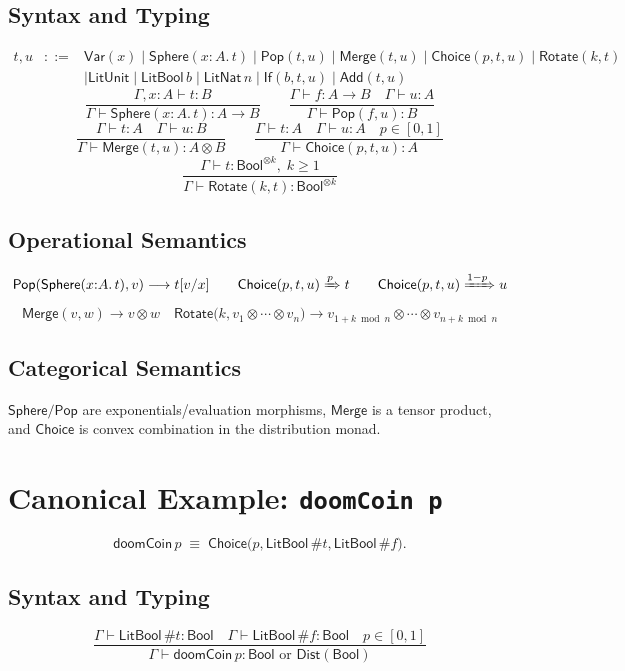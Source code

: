 \documentclass{article}
\newcommand{\Var}{\mathsf{Var}}
\newcommand{\Sphere}{\mathsf{Sphere}}
\newcommand{\Pop}{\mathsf{Pop}}
\newcommand{\Merge}{\mathsf{Merge}}
\newcommand{\Choice}{\mathsf{Choice}}
\newcommand{\Rotate}{\mathsf{Rotate}}
\newcommand{\LitUnit}{\mathsf{LitUnit}}
\newcommand{\LitBool}[1]{\mathsf{LitBool}\,#1}
\newcommand{\LitNat}[1]{\mathsf{LitNat}\,#1}
\newcommand{\If}{\mathsf{If}}
\newcommand{\Add}{\mathsf{Add}}
\newcommand{\Dist}{\mathsf{Dist}}
\newcommand{\Bool}{\mathsf{Bool}}
\newcommand{\doomCoin}[1]{\mathsf{doomCoin}\,#1}
\newcommand{\LongRightarrowp}[1]{\xRightarrow{#1}} %
\newcommand{\longto}{\longrightarrow}
\begin{document}
\subsection{Syntax and Typing}
\[
\begin{array}{rcl}
t,u &::=& \Var(x) \mid \Sphere(x{:}A.\,t) \mid \Pop(t,u) \mid \Merge(t,u) \mid \Choice(p,t,u) \mid \Rotate(k,t) \\
    && \mid \LitUnit \mid \LitBool{b} \mid \LitNat{n} \mid \If(b,t,u) \mid \Add(t,u)
\end{array}
\]
\[
\frac{\Gamma, x{:}A \vdash t : B}{\Gamma \vdash \Sphere(x{:}A.\,t) : A \to B}
\qquad
\frac{\Gamma \vdash f : A \to B \quad \Gamma \vdash u : A}{\Gamma \vdash \Pop(f,u) : B}
\]
\[
\frac{\Gamma \vdash t : A \quad \Gamma \vdash u : B}{\Gamma \vdash \Merge(t,u) : A \otimes B}
\qquad
\frac{\Gamma \vdash t : A \quad \Gamma \vdash u : A \quad p \in [0,1]}{\Gamma \vdash \Choice(p,t,u) : A}
\]
\[
\frac{\Gamma \vdash t : \Bool^{\otimes k},\; k \ge 1}{\Gamma \vdash \Rotate(k,t) : \Bool^{\otimes k}}
\]

\subsection{Operational Semantics}
\[
\Pop(\Sphere(x{:}A.\,t), v) \longto t[v/x]
\qquad
\Choice(p,t,u) \LongRightarrowp{p} t
\qquad
\Choice(p,t,u) \LongRightarrowp{1-p} u
\]
\[
\Merge(v,w) \longto v \otimes w
\quad
\Rotate\bigl(k, v_1 \otimes \cdots \otimes v_n\bigr) \longto v_{1+k \bmod n} \otimes \cdots \otimes v_{n+k \bmod n}
\]

\subsection{Categorical Semantics}
\(\Sphere/\Pop\) are exponentials/evaluation morphisms, \(\Merge\) is a tensor product, and \(\Choice\) is convex combination in the distribution monad.

\section{Canonical Example: \texttt{doomCoin p}}
\[
\doomCoin{p} \;\equiv\; \Choice\bigl(p, \LitBool{\#t}, \LitBool{\#f}\bigr).
\]

\subsection{Syntax and Typing}
\[
\frac{\Gamma \vdash \LitBool{\#t} : \Bool \quad \Gamma \vdash \LitBool{\#f} : \Bool \quad p \in [0,1]}
     {\Gamma \vdash \doomCoin{p} : \Bool \text{ or } \Dist(\Bool)}
\]
\end{document}
